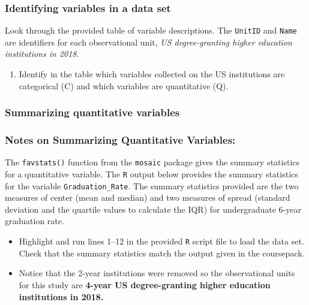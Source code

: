 \documentclass[
]{report}
\providecommand{\tightlist}{%
  \setlength{\itemsep}{0pt}\setlength{\parskip}{0pt}}
\begin{document}
\subsubsection*{Identifying variables in a data set}\label{identifying-variables-in-a-data-set}

Look through the provided table of variable descriptions. The \texttt{UnitID} and \texttt{Name} are identifiers for each observational unit, \emph{US degree-granting higher education institutions in 2018}.

\begin{enumerate}
\def\labelenumi{\arabic{enumi}.}
\tightlist
\item
  Identify in the table which variables collected on the US institutions are categorical (C) and which variables are quantitative (Q).
\end{enumerate}

\subsubsection*{Summarizing quantitative variables}\label{summarizing-quantitative-variables}

\subsubsection*{Notes on Summarizing Quantitative Variables:}\label{notes-on-summarizing-quantitative-variables}

\vspace{3in}

The \texttt{favstats()} function from the \texttt{mosaic} package gives the summary statistics for a quantitative variable. The \texttt{R} output below provides the summary statistics for the variable \texttt{Graduation\_Rate}. The summary statistics provided are the two measures of center (mean and median) and two measures of spread (standard deviation and the quartile values to calculate the IQR) for undergraduate 6-year graduation rate.

\begin{itemize}
\item
  Highlight and run lines 1--12 in the provided \texttt{R} script file to load the data set. Check that the summary statistics match the output given in the coursepack.
\item
  Notice that the 2-year institutions were removed so the observational units for this study are \textbf{4-year US degree-granting higher education institutions in 2018.}
\end{itemize}
\end{document}

